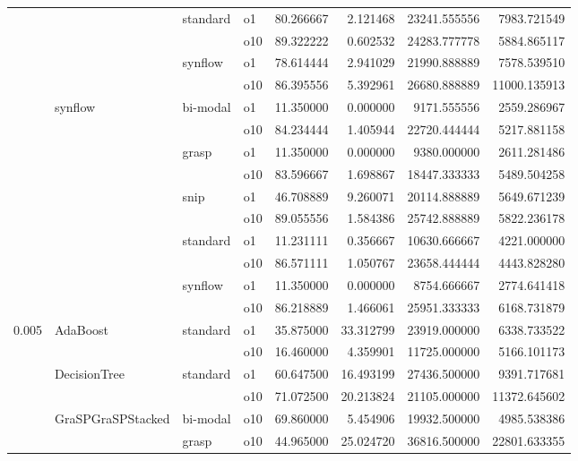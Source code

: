 \begin{longtable}{llllrrrr}
      &     & standard & o1 &  80.266667 &   2.121468 &     23241.555556 &   7983.721549 \\
      &     &         & o10 &  89.322222 &   0.602532 &     24283.777778 &   5884.865117 \\
      &     & synflow & o1 &  78.614444 &   2.941029 &     21990.888889 &   7578.539510 \\
      &     &         & o10 &  86.395556 &   5.392961 &     26680.888889 &  11000.135913 \\
      & synflow & bi-modal & o1 &  11.350000 &   0.000000 &      9171.555556 &   2559.286967 \\
      &     &         & o10 &  84.234444 &   1.405944 &     22720.444444 &   5217.881158 \\
      &     & grasp & o1 &  11.350000 &   0.000000 &      9380.000000 &   2611.281486 \\
      &     &         & o10 &  83.596667 &   1.698867 &     18447.333333 &   5489.504258 \\
      &     & snip & o1 &  46.708889 &   9.260071 &     20114.888889 &   5649.671239 \\
      &     &         & o10 &  89.055556 &   1.584386 &     25742.888889 &   5822.236178 \\
      &     & standard & o1 &  11.231111 &   0.356667 &     10630.666667 &   4221.000000 \\
      &     &         & o10 &  86.571111 &   1.050767 &     23658.444444 &   4443.828280 \\
      &     & synflow & o1 &  11.350000 &   0.000000 &      8754.666667 &   2774.641418 \\
      &     &         & o10 &  86.218889 &   1.466061 &     25951.333333 &   6168.731879 \\
0.005 & AdaBoost & standard & o1 &  35.875000 &  33.312799 &     23919.000000 &   6338.733522 \\
      &     &         & o10 &  16.460000 &   4.359901 &     11725.000000 &   5166.101173 \\
      & DecisionTree & standard & o1 &  60.647500 &  16.493199 &     27436.500000 &   9391.717681 \\
      &     &         & o10 &  71.072500 &  20.213824 &     21105.000000 &  11372.645602 \\
      & GraSPGraSPStacked & bi-modal & o10 &  69.860000 &   5.454906 &     19932.500000 &   4985.538386 \\
      &     & grasp & o10 &  44.965000 &  25.024720 &     36816.500000 &  22801.633355 \\

\end{longtable}
